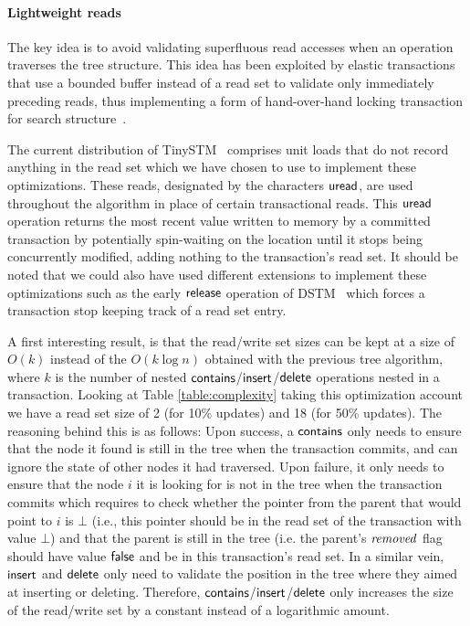\paragraph{Lightweight reads}
The key idea is to avoid validating superfluous read accesses when an operation traverses the tree structure.
This idea has been exploited by elastic transactions that use a bounded buffer instead of a read set to 
validate only immediately preceding reads, thus implementing a form of hand-over-hand locking transaction for 
search structure~\cite{FGG09}.

The current distribution of TinySTM~\cite{FFR08} comprises 
unit loads that do not record anything in the read set
which we have chosen to use to implement these optimizations.
These reads, designated by the characters $\act{uread}$, are used
throughout the algorithm in place of certain transactional reads.
This $\act{uread}$ operation returns the most recent value written to memory by a committed transaction by potentially spin-waiting on the location 
until it stops being concurrently modified, adding nothing to the transaction's read set.
It should be noted that we could also have used different extensions to implement these optimizations such as the early $\act{release}$ operation
of DSTM~\cite{HLMS03} which forces a transaction stop keeping track of a read set entry.

A first interesting result, is that 
the read/write set sizes can be kept at a size of $O(k)$ instead of the $O(k\log{n})$ obtained with the previous tree algorithm, 
where $k$ is the number of nested $\act{contains}$/$\act{insert}$/$\act{delete}$ operations nested in a transaction.
Looking at Table \ref{table:complexity} taking this optimization account we have a read set size of 2 (for 10\% updates) and 
18 (for 50\% updates).
The reasoning behind this is as follows:
Upon success, a $\act{contains}$ only needs to ensure that the node it found is still in the tree when the transaction commits,
and can ignore the state of other nodes it had traversed. Upon failure, it only needs to ensure that the node $i$ it is looking 
for is not in the tree when the transaction commits which requires to check whether the pointer from the
parent that would point to $i$ is $\bot$ (i.e., this pointer should be in the read set of the transaction with value $\bot$)
and that the parent is still in the tree (i.e. the parent's $\ms{removed}$ flag should have value $\lit{false}$ and be in this transaction's read set.
In a similar vein, $\act{insert}$ and $\act{delete}$ only need to validate the position in the tree where they aimed at inserting or deleting.
Therefore, $\act{contains}$/$\act{insert}$/$\act{delete}$ only increases the size of the read/write set by a constant instead of a logarithmic 
amount.

